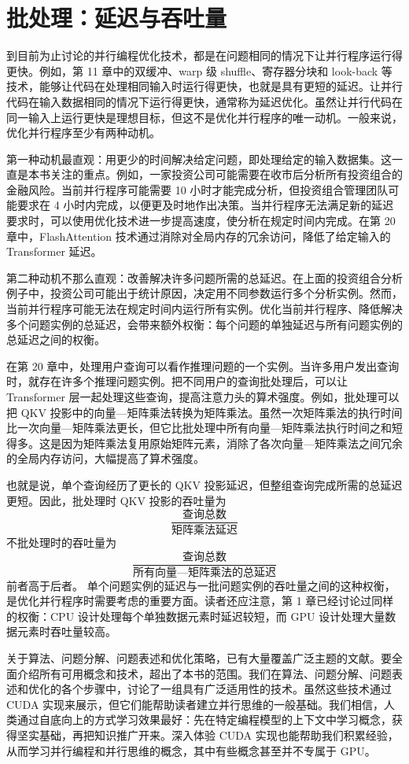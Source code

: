 \section{批处理：延迟与吞吐量}
\label{sec:batching-latency-throughput}

到目前为止讨论的并行编程优化技术，都是在问题相同的情况下让并行程序运行得更快。例如，第 11 章中的双缓冲、warp 级 shuffle、寄存器分块和 look-back 等技术，能够让代码在处理相同输入时运行得更快，也就是具有更短的延迟。让并行代码在输入数据相同的情况下运行得更快，通常称为延迟优化。虽然让并行代码在同一输入上运行更快是理想目标，但这不是优化并行程序的唯一动机。一般来说，优化并行程序至少有两种动机。

第一种动机最直观：用更少的时间解决给定问题，即处理给定的输入数据集。这一直是本书关注的重点。例如，一家投资公司可能需要在收市后分析所有投资组合的金融风险。当前并行程序可能需要 10 小时才能完成分析，但投资组合管理团队可能要求在 4 小时内完成，以便更及时地作出决策。当并行程序无法满足新的延迟要求时，可以使用优化技术进一步提高速度，使分析在规定时间内完成。在第 20 章中，FlashAttention 技术通过消除对全局内存的冗余访问，降低了给定输入的 Transformer 延迟。

第二种动机不那么直观：改善解决许多问题所需的总延迟。在上面的投资组合分析例子中，投资公司可能出于统计原因，决定用不同参数运行多个分析实例。然而，当前并行程序可能无法在规定时间内运行所有实例。优化当前并行程序、降低解决多个问题实例的总延迟，会带来额外权衡：每个问题的单独延迟与所有问题实例的总延迟之间的权衡。

在第 20 章中，处理用户查询可以看作推理问题的一个实例。当许多用户发出查询时，就存在许多个推理问题实例。把不同用户的查询批处理后，可以让 Transformer 层一起处理这些查询，提高注意力头的算术强度。例如，批处理可以把 QKV 投影中的向量—矩阵乘法转换为矩阵乘法。虽然一次矩阵乘法的执行时间比一次向量—矩阵乘法更长，但它比批处理中所有向量—矩阵乘法执行时间之和短得多。这是因为矩阵乘法复用原始矩阵元素，消除了各次向量—矩阵乘法之间冗余的全局内存访问，大幅提高了算术强度。

也就是说，单个查询经历了更长的 QKV 投影延迟，但整组查询完成所需的总延迟更短。因此，批处理时 QKV 投影的吞吐量为
\[
\frac{\text{查询总数}}{\text{矩阵乘法延迟}}
\]
不批处理时的吞吐量为
\[
\frac{\text{查询总数}}{\text{所有向量—矩阵乘法的总延迟}}
\]
前者高于后者。
单个问题实例的延迟与一批问题实例的吞吐量之间的这种权衡，是优化并行程序时需要考虑的重要方面。读者还应注意，第 1 章已经讨论过同样的权衡：CPU 设计处理每个单独数据元素时延迟较短，而 GPU 设计处理大量数据元素时吞吐量较高。

关于算法、问题分解、问题表述和优化策略，已有大量覆盖广泛主题的文献。要全面介绍所有可用概念和技术，超出了本书的范围。我们在算法、问题分解、问题表述和优化的各个步骤中，讨论了一组具有广泛适用性的技术。虽然这些技术通过 CUDA 实现来展示，但它们能帮助读者建立并行思维的一般基础。我们相信，人类通过自底向上的方式学习效果最好：先在特定编程模型的上下文中学习概念，获得坚实基础，再把知识推广开来。深入体验 CUDA 实现也能帮助我们积累经验，从而学习并行编程和并行思维的概念，其中有些概念甚至并不专属于 GPU。

